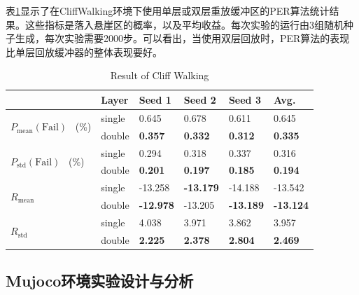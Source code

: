表\ref{tab:cliff-stats}显示了在CliffWalking环境下使用单层或双层重放缓冲区的PER算法统计结果。这些指标是落入悬崖区的概率，以及平均收益。每次实验的运行由3组随机种子生成，每次实验需要2000步。可以看出，当使用双层回放时，PER算法的表现比单层回放缓冲器的整体表现要好。

\begin{table}
\centering
\begin{tabular}{l|l|l|l|l|l} 
\toprule[2pt]
                                                    & Layer  & Seed 1           & Seed 2           & Seed 3           & Avg.              \\ 
\hline
\multirow{2}{*}{$P_\text{mean}(\text{Fail})$~ (\%)} & single & 0.645            & 0.678            & 0.611            & 0.645             \\ 
\cline{2-6}
                                                    & double & \textbf{0.357}   & \textbf{0.332}   & \textbf{0.312}   & \textbf{0.335}    \\ 
\hline
\multirow{2}{*}{$P_\text{std}(\text{Fail})$~ (\%)}  & single & 0.294            & 0.318            & 0.337            & 0.316             \\ 
\cline{2-6}
                                                    & double & \textbf{0.201}   & \textbf{0.197}   & \textbf{0.185}   & \textbf{0.194}    \\ 
\hline
\multirow{2}{*}{$R_\text{mean}$}                    & single & -13.258          & \textbf{-13.179} & -14.188          & -13.542           \\ 
\cline{2-6}
                                                    & double & \textbf{-12.978} & -13.205          & \textbf{-13.189} & \textbf{-13.124}  \\ 
\hline
\multirow{2}{*}{$R_\text{std}$}                     & single & 4.038            & 3.971            & 3.862            & 3.957             \\ 
\cline{2-6}
                                                    & double & \textbf{2.225}   & \textbf{2.378}   & \textbf{2.804}   & \textbf{2.469}    \\
\bottomrule[2pt]
\end{tabular}
\caption{Result of Cliff Walking}
\label{tab:cliff-stats}
\end{table}

\subsection{Mujoco环境实验设计与分析}

